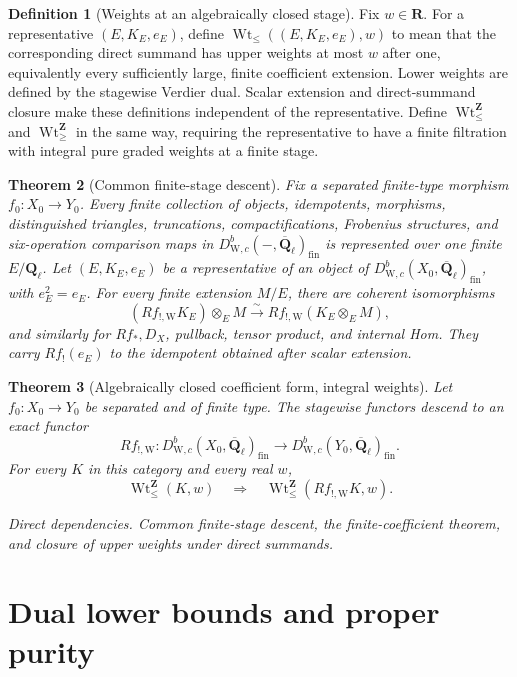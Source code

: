\documentclass[10pt]{article}
\newtheorem{theorem}{Theorem}[section]
\theoremstyle{definition}
\newtheorem{definition}[theorem]{Definition}
\newcommand{\Ql}{\mathbf Q_\ell}
\newcommand{\Qlb}{\overline{\mathbf Q}_\ell}
\newcommand{\DW}{D^b_{\mathrm W,c}}
\newcommand{\WtLe}{\operatorname{Wt}_{\leq}}
\newcommand{\IntWtLe}{\operatorname{Wt}^{\mathbf Z}_{\leq}}
\newcommand{\IntWtGe}{\operatorname{Wt}^{\mathbf Z}_{\geq}}
\newcommand{\dep}[1]{\par\smallskip\noindent\textit{Direct dependencies.} #1\par}
\begin{document}
\begin{definition}[Weights at an algebraically closed stage]
Fix \(w\in\mathbf R\).  For a representative \((E,K_E,e_E)\), define
\(\WtLe((E,K_E,e_E),w)\) to mean that the corresponding direct summand has
upper weights at most \(w\) after one, equivalently every sufficiently large, finite
coefficient extension.  Lower weights are defined by the stagewise Verdier
dual.  Scalar extension and direct-summand closure make these definitions
independent of the representative.  Define \(\IntWtLe\) and
\(\IntWtGe\) in the same way, requiring the representative to have a
finite filtration with integral pure graded weights at a finite stage.
\end{definition}

\begin{theorem}[Common finite-stage descent]
Fix a separated finite-type morphism \(f_0:X_0\to Y_0\).
Every finite collection of objects, idempotents, morphisms, distinguished
triangles, truncations, compactifications, Frobenius structures, and
six-operation comparison maps in
\(\DW(-,\Qlb)_{\mathrm{fin}}\) is represented over one finite
\(E/\Ql\).  Let \((E,K_E,e_E)\) be a representative of an object of
\(\DW(X_0,\Qlb)_{\mathrm{fin}}\), with \(e_E^2=e_E\).  For every finite
extension \(M/E\), there are coherent
isomorphisms
\[
 (Rf_{!,\mathrm W}K_E)\otimes_EM
 \xrightarrow{\sim}Rf_{!,\mathrm W}(K_E\otimes_EM),
\]
and similarly for \(Rf_*,D_X\), pullback, tensor product, and internal Hom.
They carry \(Rf_!(e_E)\) to the idempotent obtained after scalar extension.
\end{theorem}

\begin{theorem}[Algebraically closed coefficient form, integral weights]
Let \(f_0:X_0\to Y_0\) be separated and of finite type.
The stagewise functors descend to an exact functor
\[
 Rf_{!,\mathrm W}:\DW(X_0,\Qlb)_{\mathrm{fin}}
       \longrightarrow\DW(Y_0,\Qlb)_{\mathrm{fin}}.
\]
For every \(K\) in this category and every real \(w\),
\[
             \IntWtLe(K,w)\quad\Longrightarrow\quad
             \IntWtLe(Rf_{!,\mathrm W}K,w).
\]
\dep{Common finite-stage descent, the finite-coefficient theorem, and
closure of upper weights under direct summands.}
\end{theorem}

\section{Dual lower bounds and proper purity}
\end{document}

